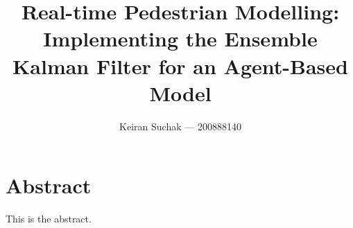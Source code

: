 \documentclass[12pt, twoside, a4paper]{report}
\begin{document}
\title{Real-time Pedestrian Modelling: Implementing the Ensemble Kalman Filter
for an Agent-Based Model}
\author{Keiran Suchak --- 200888140}
\maketitle

\chapter*{\centering Abstract}

This is the abstract.

\tableofcontents
\listoffigures
\listoftables




\end{document}
